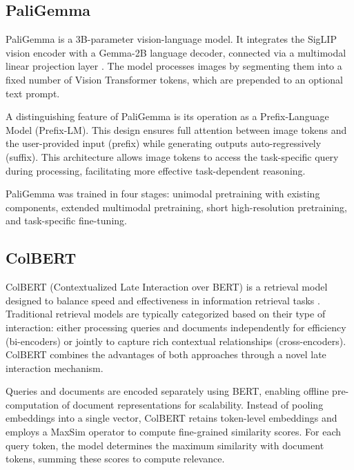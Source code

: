 \subsection*{PaliGemma}
\label{subsection:glossary_paligemma}

PaliGemma is a 3B-parameter vision-language model. It integrates the SigLIP vision encoder with a Gemma-2B language decoder, connected via a multimodal linear projection layer . The model processes images by segmenting them into a fixed number of Vision Transformer  tokens, which are prepended to an optional text prompt.

A distinguishing feature of PaliGemma is its operation as a Prefix-Language Model (Prefix-LM). This design ensures full attention between image tokens and the user-provided input (prefix) while generating outputs auto-regressively (suffix). This architecture allows image tokens to access the task-specific query during processing, facilitating more effective task-dependent reasoning.

PaliGemma was trained in four stages: unimodal pretraining with existing components, extended multimodal pretraining, short high-resolution pretraining, and task-specific fine-tuning.


\subsection*{ColBERT}
\label{subsection:glossary_colbert}

ColBERT (Contextualized Late Interaction over BERT) is a retrieval model designed to balance speed and effectiveness in information retrieval tasks . Traditional retrieval models are typically categorized based on their type of interaction: either processing queries and documents independently for efficiency (bi-encoders) or jointly to capture rich contextual relationships (cross-encoders). ColBERT combines the advantages of both approaches through a novel late interaction mechanism.

Queries and documents are encoded separately using BERT, enabling offline pre-computation of document representations for scalability. Instead of pooling embeddings into a single vector, ColBERT retains token-level embeddings and employs a MaxSim operator to compute fine-grained similarity scores. For each query token, the model determines the maximum similarity with document tokens, summing these scores to compute relevance.

